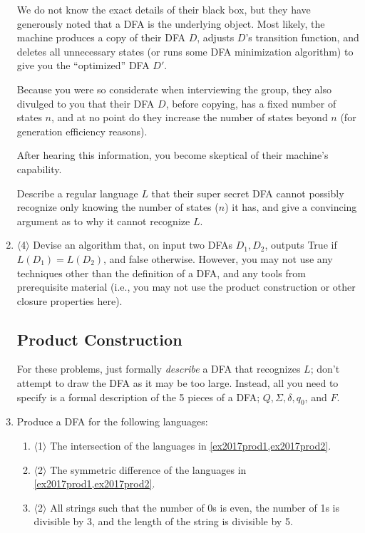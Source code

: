 \documentclass[]{article}
\newcommand{\Level}[1]{{\color{blue} $\langle$#1$\rangle$}}
\begin{document}
\begin{enumerate}
We do not know the exact details of their black box, but they have generously noted that a DFA is the underlying object.
Most likely, the machine produces a copy of their DFA $D$, adjusts $D$'s transition function, and deletes all unnecessary states (or runs some DFA minimization algorithm) to give you the ``optimized'' DFA $D'$.

Because you were so considerate when interviewing the group, they also divulged to you that their DFA $D$, before copying, has a fixed number of states $n$, and at no point do they increase the number of states beyond $n$ (for generation efficiency reasons).

After hearing this information, you become skeptical of their machine's capability.

Describe a regular language $L$ that their super secret DFA cannot possibly recognize only knowing the number of states ($n$) it has, and give a convincing argument as to why it cannot recognize $L$.

\item \label{dfa_equal_no_product} \Level{4} Devise an algorithm that, on input two DFAs $D_1, D_2$, outputs True if $L(D_1) = L(D_2)$, and false otherwise.
However, you may not use any techniques other than the definition of a DFA, and any tools from prerequisite material (i.e., you may not use the product construction or other closure properties here).

\subsection{Product Construction}

For these problems, just formally \textit{describe} a DFA that recognizes $L$; don't attempt to draw the DFA as it may be too large. 
Instead, all you need to specify is a formal description of the 5 pieces of a DFA; $Q, \Sigma, \delta, q_0$, and $F$.

\item Produce a DFA for the following languages:
\begin{enumerate}


\item \Level{1} The intersection of the languages in \cref{ex2017prod1,ex2017prod2}.

\item \Level{2} The symmetric difference of the languages in \cref{ex2017prod1,ex2017prod2}.

\item \Level{2} All strings such that the number of 0s is even, the number of 1s is divisible by 3, and the length of the string is divisible by 5.


\end{enumerate}
\end{enumerate}
\end{document}
